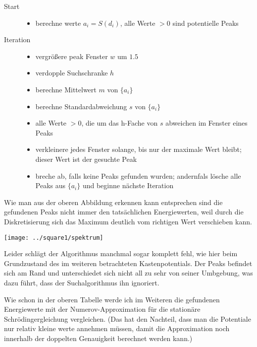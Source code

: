 \documentclass[10pt,a4paper,german]{scrartcl}
\begin{document}
		\begin{description}
			\item[Start]
				\begin{itemize}
					\item{berechne werte $a_i = S(d_i)$,
					  alle Werte $>0$ sind potentielle Peaks}
				\end{itemize}
			\item[Iteration]
				\begin{itemize}
					\item{vergrößere peak Fenster $w$ um $1.5$}
					\item{verdopple Suchschranke $h$}
					\item{berechne Mittelwert $m$ von $\{a_i\}$}
					\item{berechne Standardabweichung $s$ von $\{a_i\}$}
					\item{alle Werte $>0$, die um das h-Fache von $s$
					  abweichen im Fenster eines Peaks}
					\item{verkleinere jedes Fenster solange, 
					  bis nur der maximale Wert bleibt;
					  dieser Wert ist der gesuchte Peak}
					\item{breche ab, falls keine Peaks gefunden wurden;
					  andernfals lösche alle Peaks aus $\{a_i\}$ 
					  und beginne nächste Iteration}
				\end{itemize}
		\end{description}
			
		Wie man aus der oberen Abbildung erkennen kann entsprechen sind die
		gefundenen Peaks nicht immer den tatsächlichen Energiewerten, weil
		durch die Diskretisierung sich das Maximum deutlich vom richtigen Wert
		verschieben kann.

		\texttt{[image: ../square1/spektrum]}
		
		Leider schlägt der Algorithmus manchmal sogar komplett fehl, wie hier beim
		Grundzustand des im weiteren betrachteten Kastenpotentials. Der Peaks befindet
		sich am Rand und unterschiedet sich nicht all zu sehr von seiner Umbgebung,
		was dazu führt, dass der Suchalgorithmus ihn ignoriert.
		
		
		Wie schon in der oberen Tabelle werde ich im Weiteren die gefundenen
		Energiewerte mit der Numerov-Approximation für die stationäre 
		Schrödingergleichung vergleichen. (Das hat den Nachteil, dass man die
		Potentiale nur relativ kleine werte annehmen müssen, damit die Approximation
		noch innerhalb der doppelten Genauigkeit berechnet werden kann.)
		
\end{document}
